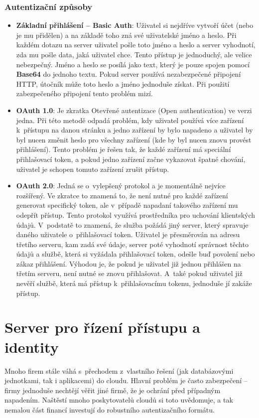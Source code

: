 \subsubsection{Autentizační způsoby}
\begin{itemize}
\item \textbf{Základní přihlášení -- Basic Auth}: Uživatel si nejdříve vytvoří účet (nebo je mu přidělen) a na základě toho zná své uživatelské jméno a heslo. Při každém dotazu na server uživatel pošle toto jméno a heslo a server vyhodnotí, zda mu pošle data, jaká uživatel chce. Tento přístup je jednoduchý, ale velice nebezpečný. Jméno a heslo se posílá jako text, který je pouze spojen pomocí \textbf{Base64} do jednoho textu. Pokud server používá nezabezpečené připojení HTTP, útočník může toto heslo a jméno jednoduše získat. Při použití zabezpečeného připojení tento problém mizí. \cite{rest-cookbook}
\item \textbf{OAuth 1.0}: Je zkratka Otevřené autentizace (Open authentication) ve verzi jedna. Při této metodě odpadá problém, kdy uživatel používá více zařízení k~přístupu na danou stránku a jedno zařízení by bylo napadeno a uživatel by byl nucen změnit heslo pro všechny zařízení (kde by byl nucen znovu provést přihlášení). Tento problém je řešen tak, že každé zařízení má speciální přihlašovací token, a pokud jedno zařízení začne vykazovat špatné chování, uživatel je schopen tomuto zařízení zrušit přístup. \cite{rest-cookbook}
\item \textbf{OAuth 2.0}: Jedná se o~vylepšený protokol a je momentálně nejvíce rozšířený. Ve zkratce to znamená to, že není nutné pro každé zařízení generovat specifický token, ale v~případě napadaní takového zařízení mu odepřít přístup. Tento protokol využívá prostředníka pro uchování klientských údajů. V~podstatě to znamená, že služba požádá jiný server, který spravuje daného uživatele o~přihlašovací token. Uživatel je přesměrován na adresu třetího serveru, kam zadá své údaje, server poté vyhodnotí správnost těchto údajů a službě, která si vyžádala přihlašovací token, odešle buď povolení nebo zákaz přihlášení. Výhodou je, že pokud je uživatel již jednou přihlášen na třetím serveru, není nutné se znovu přihlašovat. A~také pokud uživatel již nevěří službě, která má přístup k~přihlašovacímu tokenu, jednoduše jí zakáže přístup. \cite{rest-cookbook}
\end{itemize}

\section{Server pro řízení přístupu a identity}
\par Mnoho firem stále váhá s~přechodem z~vlastního řešení (jak databázovými jednotkami, tak i aplikacemi) do cloudu. Hlavní problém je často zabezpečení -- firmy jednoduše nechtějí věřit jiné firmě, že je ochrání před případným napadením. Naštěstí mnoho poskytovatelů cloudů si toto uvědomuje, a tak nemalou část financí investují do robustního autentizačního formátu. \cite{cloud-security}

